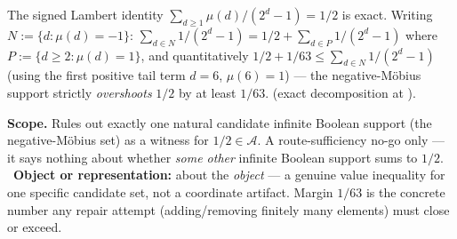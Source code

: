 \begin{prop}
\label{prop:mobius-nogo}
The signed Lambert identity $\sum_{d\ge1}\mu(d)/(2^d-1) = 1/2$ is exact. Writing
$N:=\{d:\mu(d)=-1\}$: $\sum_{d\in N}1/(2^d-1) = 1/2 + \sum_{d\in P}1/(2^d-1)$ where $P:=\{d\ge2:
\mu(d)=1\}$, and quantitatively $1/2 + 1/63 \le \sum_{d\in N}1/(2^d-1)$ (using the first positive
tail term $d=6$, $\mu(6)=1$) — the negative-Möbius support strictly \emph{overshoots} $1/2$ by at
least $1/63$.
(exact decomposition at
).

\textbf{Scope.} Rules out exactly one natural candidate infinite Boolean support (the negative-Möbius
set) as a witness for $1/2\in\mathcal A$. A route-sufficiency no-go only — it says nothing about
whether \emph{some other} infinite Boolean support sums to $1/2$.
\ \textbf{Object or representation:} about the \emph{object} — a genuine
value inequality for one specific candidate set, not a coordinate artifact. Margin $1/63$ is the
concrete number any repair attempt (adding/removing finitely many elements) must close or exceed.
\end{prop}

